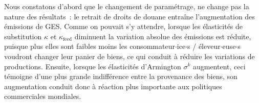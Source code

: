 Nous constatons d'abord que le changement de paramétrage, ne change pas la nature des résultats~: le retrait de droits de douane entraîne l'augmentation des émissions de GES. Comme on pouvait s'y attendre, lorsque les élasticités de substitution $\kappa$ et $\kappa_\text{feed}$ diminuent la variation absolue des émissions est réduite, puisque plus elles sont faibles moins les consommateur$\cdot$ice$\cdot$s / éleveur$\cdot$euse$\cdot$s voudront changer leur panier de biens, ce qui conduit à réduire les variations de productions. Ensuite, lorsque les élasticités d'Armington $\sigma^k$ augmentent, ceci témoigne d'une plus grande indifférence entre la provenance des biens, son augmentation conduit donc à réaction plus importante aux politiques commerciales mondiales.
